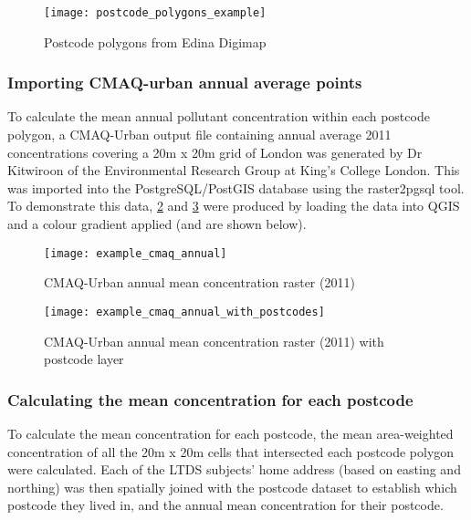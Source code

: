 \begin{figure}[H]
\centering
\texttt{[image: postcode\_polygons\_example]}
\caption{Postcode polygons from Edina Digimap}
\label{fig:postcode_polygons_example}
\end{figure}

        \subsubsection{Importing CMAQ-urban annual average points}
        \label{importing_cmaq_annual_averages}

To calculate the mean annual pollutant concentration within each postcode polygon, a CMAQ-Urban output file containing annual average 2011 concentrations covering a 20m x 20m grid of London was generated by Dr Kitwiroon of the Environmental Research Group at King's College London. This was imported into the PostgreSQL/PostGIS database using the raster2pgsql tool. To demonstrate this data, \ref{fig:example_cmaq_annual} and \ref{fig:example_cmaq_annual_with_postcodes} were produced by loading the data into QGIS and a colour gradient applied (and are shown below).

\begin{figure}[H]
\centering
\texttt{[image: example\_cmaq\_annual]}
\caption{CMAQ-Urban annual mean concentration raster (2011)}
\label{fig:example_cmaq_annual}
\end{figure}

\begin{figure}[H]
\centering
\texttt{[image: example\_cmaq\_annual\_with\_postcodes]}
\caption{CMAQ-Urban annual mean concentration raster (2011) with postcode layer}
\label{fig:example_cmaq_annual_with_postcodes}
\end{figure}

        \subsubsection{Calculating the mean concentration for each postcode}
        \label{calculating_mean_postcode_data}

To calculate the mean concentration for each postcode, the mean area-weighted concentration of all the 20m x 20m cells that intersected each postcode polygon were calculated. Each of the LTDS subjects' home address (based on easting and northing) was then spatially joined with the postcode dataset to establish which postcode they lived in, and the annual mean concentration for their postcode.


